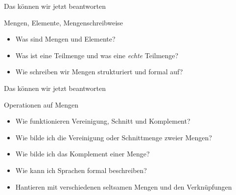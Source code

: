 \begin{frame}[fragile]{Das können wir jetzt beantworten}
	\begin{alertblock}{Mengen, Elemente, Mengenschreibweise}
		\begin{itemize}
			\item Was sind Mengen und Elemente?
			\item Was ist eine Teilmenge und was eine \textit{echte} Teilmenge?
			\item Wie schreiben wir Mengen strukturiert und formal auf?
		\end{itemize}
	\end{alertblock}
\end{frame}

\begin{frame}[fragile]{Das können wir jetzt beantworten}
	\begin{alertblock}{Operationen auf Mengen}
		\begin{itemize}
			\item Wie funktionieren Vereinigung, Schnitt und Komplement?
			\item Wie bilde ich die Vereinigung oder Schnittmenge zweier Mengen?
			\item Wie bilde ich das Komplement einer Menge?
			\item Wie kann ich Sprachen formal beschreiben?
			\item Hantieren mit verschiedenen seltsamen Mengen und den Verknüpfungen
		\end{itemize}
	\end{alertblock}
\end{frame}